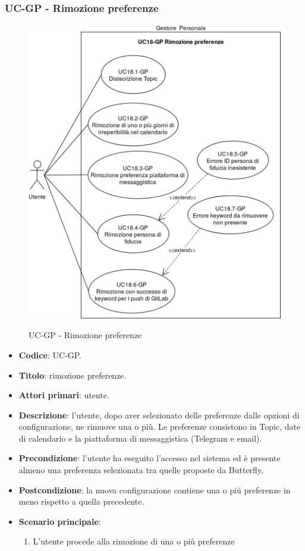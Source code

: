 \subsubsection{UC\theuccount-GP - Rimozione preferenze}
		\begin{figure}[H]
			\centering
				\includegraphics[width=\textwidth]{img/casi_d'uso/UC18.png}\\
			\caption{UC\theuccount-GP - Rimozione preferenze}
		\end{figure}
	\begin{itemize}
		\item \textbf{Codice}: UC\theuccount-GP.
		\item \textbf{Titolo}: rimozione preferenze.
		\item \textbf{Attori primari}: utente.
		\item \textbf{Descrizione}: l’utente, dopo aver selezionato delle preferenze dalle opzioni di configurazione, ne rimuove una o più. Le preferenze consistono in Topic, date di calendario e la piattaforma di messaggistica (Telegram e email).
		\item \textbf{Precondizione}: l’utente ha eseguito l'accesso nel sistema ed è presente almeno	una preferenza selezionata tra quelle proposte da Butterfly.
		\item \textbf{Postcondizione}: la nuova configurazione contiene una o più preferenze in meno rispetto	a quella precedente.
		\item \textbf{Scenario principale}:
		\begin{enumerate}
			\item L'utente procede alla rimozione di una o più preferenze
		\end{enumerate}
	\end{itemize}

